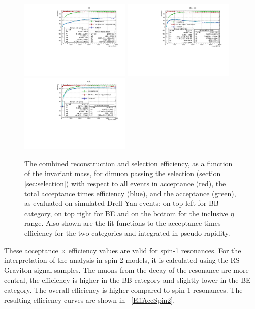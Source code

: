 \begin{figure}[htbp]
\centering
\includegraphics[width=0.47\textwidth]{Images/Cap5/AccEff_BB.pdf}
\includegraphics[width=0.47\textwidth]{Images/Cap5/AccEff_BE.pdf}
\includegraphics[width=0.47\textwidth]{Images/Cap5/AccEff_All.pdf}
\caption{The combined reconstruction and selection efficiency, as a function of the invariant mass, for dimuon passing the selection (section \ref{sec:selection}) with respect to all events in acceptance (red), the total acceptance times efficiency (blue), and the acceptance (green), as evaluated on simulated Drell-Yan events: on top left for BB category, on top right for BE and on the bottom for the inclusive $\eta$ range. Also shown are the fit functions to the acceptance times efficiency for the two categories and integrated in pseudo-rapidity.}
\label{EffAcc}
\end{figure}

These acceptance $\times$ efficiency values are valid for spin-1 resonances. For the interpretation of the analysis in spin-2 models, it is calculated using the RS Graviton signal samples. The muons from the decay of the resonance are more central, the efficiency is higher in the BB category and slightly lower in the BE category. The overall efficiency is higher compared to spin-1 resonances. The resulting efficiency curves are shown in \figurename~\ref{EffAccSpin2}.

